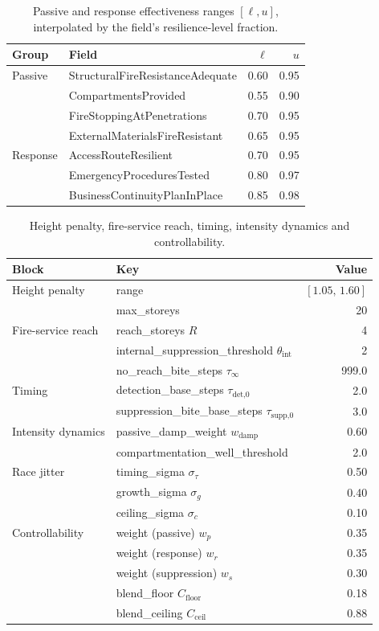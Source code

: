 \documentclass[11pt,a4paper]{article}
\begin{document}
\begin{table}[H]
\centering
\caption{Passive and response effectiveness ranges $[\ell,u]$, interpolated by
the field's resilience-level fraction.}
\begin{tabular}{llrr}
\toprule
Group & Field & $\ell$ & $u$ \\
\midrule
Passive  & StructuralFireResistanceAdequate & 0.60 & 0.95 \\
         & CompartmentsProvided & 0.55 & 0.90 \\
         & FireStoppingAtPenetrations & 0.70 & 0.95 \\
         & ExternalMaterialsFireResistant & 0.65 & 0.95 \\
\midrule
Response & AccessRouteResilient & 0.70 & 0.95 \\
         & EmergencyProceduresTested & 0.80 & 0.97 \\
         & BusinessContinuityPlanInPlace & 0.85 & 0.98 \\
\bottomrule
\end{tabular}
\end{table}

\begin{table}[H]
\centering
\caption{Height penalty, fire-service reach, timing, intensity dynamics and
controllability.}
\begin{tabular}{llr}
\toprule
Block & Key & Value \\
\midrule
Height penalty & range & $[1.05,\,1.60]$ \\
               & max\_storeys & 20 \\
\midrule
Fire-service reach & reach\_storeys $R$ & 4 \\
                   & internal\_suppression\_threshold $\theta_{\text{int}}$ & 2 \\
                   & no\_reach\_bite\_steps $\tau_\infty$ & 999.0 \\
\midrule
Timing & detection\_base\_steps $\tau_{\text{det,0}}$ & 2.0 \\
       & suppression\_bite\_base\_steps $\tau_{\text{supp,0}}$ & 3.0 \\
\midrule
Intensity dynamics & passive\_damp\_weight $w_{\text{damp}}$ & 0.60 \\
                   & compartmentation\_well\_threshold & 2.0 \\
\midrule
Race jitter & timing\_sigma $\sigma_\tau$ & 0.50 \\
            & growth\_sigma $\sigma_g$ & 0.40 \\
            & ceiling\_sigma $\sigma_c$ & 0.10 \\
\midrule
Controllability & weight (passive) $w_p$ & 0.35 \\
                & weight (response) $w_r$ & 0.35 \\
                & weight (suppression) $w_s$ & 0.30 \\
                & blend\_floor $C_{\text{floor}}$ & 0.18 \\
                & blend\_ceiling $C_{\text{ceil}}$ & 0.88 \\
\bottomrule
\end{tabular}
\end{table}
\end{document}
